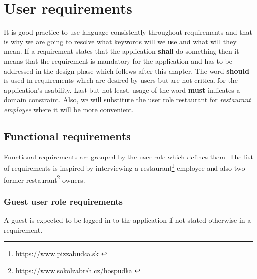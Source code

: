 \section{User requirements}
It is good practice to use language consistently throughout requirements and that is why we are going to resolve what keywords will we use and what will they mean.
If a requirement states that the application \textbf{shall} do something then it means that the requirement is mandatory for the application and has to be addressed in the design phase which follows after this chapter. 
The word \textbf{should} is used in requirements which are desired by users but are not critical for the application's usability.
Last but not least, usage of the word \textbf{must} indicates a domain constraint.
Also, we will substitute the user role restaurant for \emph{restaurant employee} where it will be more convenient.

\subsection{Functional requirements}
Functional requirements are grouped by the user role which defines them.
The list of requirements is inspired by interviewing a restaurant\footnote{\url{https://www.pizzabudca.sk}  \label{fnlabel}} employee and also two former restaurant\footnote{\url{https://www.sokolzabreh.cz/hospudka}  \label{fnlabel}} owners.

\subsubsection{Guest user role requirements}
A guest is expected to be logged in to the application if not stated otherwise in a requirement.

